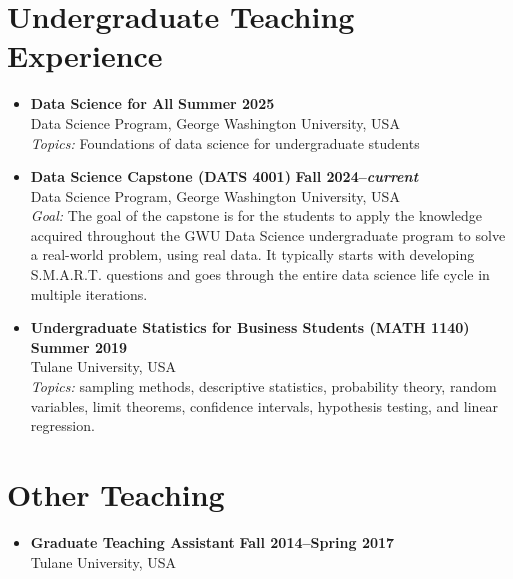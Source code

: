 \documentclass[11pt]{article}
\begin{document}
\section{Undergraduate Teaching Experience}
\begin{itemize}[leftmargin=*]
\item \textbf{Data Science for All} \hfill
  \textbf{\footnotesize Summer 2025}\\
  Data Science Program, George Washington University, USA \\
  \emph{Topics:} Foundations of data science for undergraduate students

\item \textbf{Data Science Capstone (DATS 4001)} \hfill
  \textbf{\footnotesize Fall 2024--\emph{current}}\\
    Data Science Program, George Washington University, USA\\
  \emph{Goal:} The goal of the capstone is for the students to apply the knowledge acquired throughout the GWU Data Science undergraduate program to solve a real-world problem, using real data. It typically starts with developing S.M.A.R.T. questions and goes through the entire data science life cycle in multiple iterations.


\item \textbf{Undergraduate Statistics for Business Students (MATH 1140)} \hfill
  \textbf{\footnotesize Summer 2019}\\
  Tulane University, USA \\
  \emph{Topics:} sampling methods, descriptive statistics, probability theory,
  random variables, limit theorems, confidence intervals, hypothesis
  testing, and linear regression.
\end{itemize}

\section{Other Teaching}
\begin{itemize}[leftmargin=*]
\item \textbf{Graduate Teaching Assistant} \hfill
  \textbf{\footnotesize Fall 2014--Spring 2017}\\
  Tulane University, USA
\end{itemize}
\end{document}
